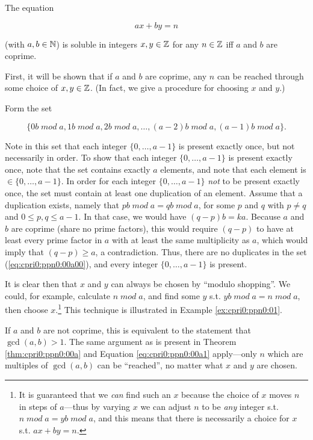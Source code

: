 \begin{vworklemmastatement}
\label{lem:cpri0:ppn0:00a}
The equation

\begin{equation}
 ax + by = n
\end{equation}

(with $a,b \in {\mathbb{N}}$) is soluble in integers 
$x,y \in {\mathbb{Z}}$ for any $n \in {\mathbb{Z}}$ iff
$a$ and $b$ are coprime.
\end{vworklemmastatement}
\begin{vworklemmaproof}
First, it will be shown that if $a$ and $b$ are coprime,
any $n$ can be reached through some choice of
$x,y \in {\mathbb{Z}}$.  (In fact, we give a 
procedure for choosing $x$ and $y$.)

Form the set

\begin{equation}
\label{eq:cpri0:ppn0:00a00}
\{ 0b \; mod \; a, 1b \; mod \; a, 2b \; mod \; a, 
\ldots{} , (a-2)b \; mod \; a, (a-1)b \; mod \; a \} .
\end{equation}

Note in this set that each integer $\{0, \ldots, a-1 \}$
is present exactly once, but not necessarily in order.  
To show that each integer
$\{0, \ldots, a-1 \}$ is present exactly once, note that
the set contains exactly $a$ elements, and note that each
element is $\in \{0, \ldots, a-1 \}$.  In order for each
integer $\{0, \ldots, a-1 \}$ \emph{not} to be present
exactly once, the set must contain at least one duplication
of an element.  Assume that a duplication exists, namely 
that $pb \; mod \; a = qb \; mod \; a$, for some $p$ and $q$
with $p \neq q$ and $0 \leq p,q \leq a-1$.  In that case,
we would have $(q-p) b = ka$.  Because $a$ and $b$ are
coprime (share no prime factors), this would require $(q-p)$ 
to have at least every prime factor in $a$ with at least the
same multiplicity as $a$, which would imply that 
$(q-p) \geq a$, a contradiction.  Thus, there are no
duplicates in the set (\ref{eq:cpri0:ppn0:00a00}), and
every integer $\{0, \ldots, a-1 \}$ is present.

It is clear then that $x$ and $y$ can always be chosen by
``modulo shopping''.  We could, for example, 
calculate $n \; mod \; a$, and find some $y$
s.t. $yb \; mod \; a = n \; mod \; a$, then choose $x$.\footnote{It 
is guaranteed
that we \emph{can} find such an $x$ because 
the choice of $x$ moves $n$ in steps 
of $a$---thus by varying $x$ we can adjust $n$ to be \emph{any}
integer s.t. $n \; mod \; a = yb \; mod \; a$, and this means
that there is necessarily a choice for $x$ s.t. $ax+by=n$.}
This technique is illustrated in Example \ref{ex:cpri0:ppn0:01}.

If $a$ and $b$ are not coprime, this is equivalent to the
statement that $\gcd(a,b) > 1$.  The same argument as is present
in Theorem \ref{thm:cpri0:ppn0:00a} 
and Equation \ref{eq:cpri0:ppn0:00a1} apply---only
$n$ which are multiples of $\gcd(a,b)$ can be 
``reached'', no matter what $x$ and $y$ are chosen.
\end{vworklemmaproof}


